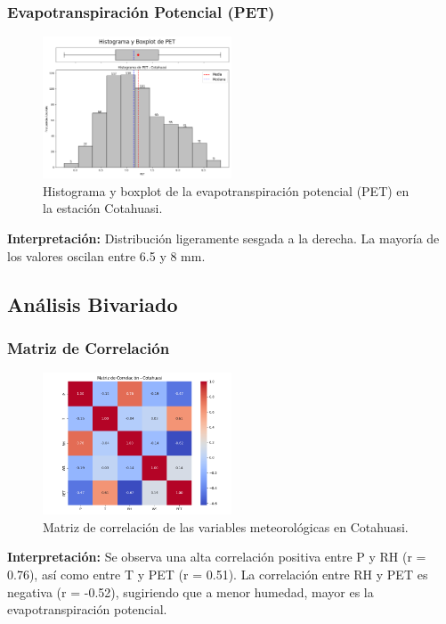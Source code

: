 \subsubsection*{Evapotranspiración Potencial (PET)}
\begin{figure}[H]
\centering
\includegraphics[width=0.5\textwidth]{resultados/por_estacion_meteorologica/Cotahuasi/PET_histograma.png}
\caption{Histograma y boxplot de la evapotranspiración potencial (PET) en la estación Cotahuasi.}
\label{fig:cotahuasi_PET}
\end{figure}
\textbf{Interpretación:} Distribución ligeramente sesgada a la derecha. La mayoría de los valores oscilan entre 6.5 y 8 mm.

\subsection{Análisis Bivariado}

\subsubsection*{Matriz de Correlación}
\begin{figure}[H]
\centering
\includegraphics[width=0.5\textwidth]{resultados/por_estacion_meteorologica/Cotahuasi/matriz_correlacion.png}
\caption{Matriz de correlación de las variables meteorológicas en Cotahuasi.}
\label{fig:cotahuasi_corr}
\end{figure}
\textbf{Interpretación:} Se observa una alta correlación positiva entre P y RH (r = 0.76), así como entre T y PET (r = 0.51). La correlación entre RH y PET es negativa (r = -0.52), sugiriendo que a menor humedad, mayor es la evapotranspiración potencial.

